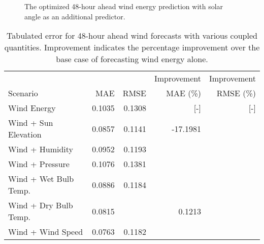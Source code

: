 \begin{figure*}[!ht]
  \centering
  
  \caption{The optimized 48-hour ahead wind energy prediction with solar angle as an additional predictor.}
  \label{fig:wind48}
\end{figure*}
  \begin{table*}[!ht]
    \centering
    \caption{Tabulated error for 48-hour ahead wind forecasts with various coupled quantities. Improvement indicates the percentage improvement over the base case of forecasting wind energy alone.}
    \label{tab:wind48}
    \begin{tabular}{l|r|r|r|r}
      &  & & Improvement & Improvement \\
      Scenario  & MAE & RMSE & MAE (\%) & RMSE (\%)\\
      \hline
      Wind Energy & 0.1035 & 0.1308 & [-] & [-] \\
      Wind + Sun Elevation & 0.0857 & 0.1141 & -17.1981 &\\
      Wind + Humidity & 0.0952 & 0.1193 & & \\
      Wind + Pressure & 0.1076 & 0.1381 & & \\
      Wind + Wet Bulb Temp. & 0.0886 & 0.1184 & & \\
      Wind + Dry Bulb Temp. & 0.0815 & & 0.1213 & \\
      Wind + Wind Speed & 0.0763 & 0.1182 & & \\
    \end{tabular}
  \end{table*}
